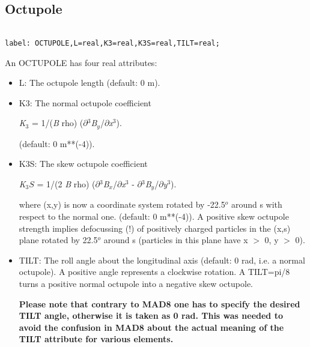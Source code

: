 





\subsection{Octupole}
\begin{verbatim}

label: OCTUPOLE,L=real,K3=real,K3S=real,TILT=real;
\end{verbatim} An OCTUPOLE has four real attributes: 
\begin{itemize}
	\item L: The octupole length (default: 0 m). 
	\item K3: The normal octupole coefficient 

\textit{K}$_3$ = 1/(\textit{B} rho) ($\partial$$^3$\textit{B$_y$}/$\partial$\textit{x}$^3$). 

 (default: 0 m**(-4)). 
	\item K3S: The skew octupole coefficient 

\textit{K}$_3S$ = 1/(2 \textit{B} rho) ($\partial$$^3$\textit{B$_x$}/$\partial$\textit{x}$^3$ - $\partial$$^3$\textit{B$_y$}/$\partial$\textit{y}$^3$). 

 where (x,y) is now a coordinate system rotated by -22.5$^o$ around s with respect to the normal one. (default: 0 m**(-4)). A positive skew octupole strength implies defocussing (!) of positively charged particles in the (x,s) plane rotated by 22.5$^o$ around s (particles in this plane have x $>$ 0, y $>$ 0). 


	\item TILT: The roll angle about the longitudinal axis (default: 0 rad, i.e. a normal octupole). A positive angle represents a clockwise rotation. A TILT=pi/8 turns a positive normal octupole into a negative skew octupole. 

\textbf{  Please note that contrary to MAD8 one has to specify the desired TILT angle, otherwise it is taken as 0 rad. This was needed to avoid the confusion in MAD8 about the actual meaning of the TILT attribute for various elements. }
\end{itemize}

